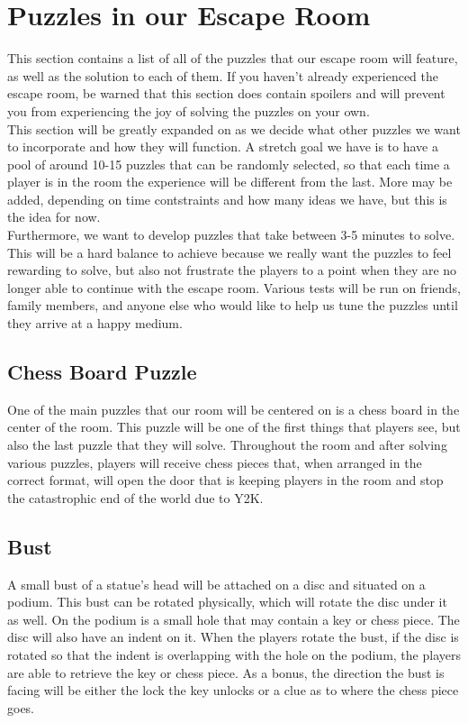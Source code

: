 \documentclass[conference]{IEEEtran}
\begin{document}
\section{Puzzles in our Escape Room}
This section contains a list of all of the puzzles that our escape room will feature, as well as
the solution to each of them. If you haven't already experienced the escape room, be warned that
this section does contain spoilers and will prevent you from experiencing the joy of solving the
puzzles on your own.
\\
\indent This section will be greatly expanded on as we decide what other puzzles we want to incorporate and how they will function.
A stretch goal we have is to have a pool of around 10-15 puzzles that can be randomly selected, so that each time a player is in the
room the experience will be different from the last. More may be added, depending on time contstraints and how many ideas we
have, but this is the idea for now.
\\
\indent Furthermore, we want to develop puzzles that take between 3-5 minutes to solve. This will be a hard balance
to achieve because we really want the puzzles to feel rewarding to solve, but also not frustrate the players
to a point when they are no longer able to continue with the escape room. Various tests will be run on friends, family members,
and anyone else who would like to help us tune the puzzles until they arrive at a happy medium.


\subsection{Chess Board Puzzle}
One of the main puzzles that our room will be centered on is a chess board in the center of the room.
This puzzle will be one of the first things that players see, but also the last puzzle that they will solve.
Throughout the room and after solving various puzzles, players will receive chess pieces that, when
arranged in the correct format, will open the door that is keeping players in the room and stop the
catastrophic end of the world due to Y2K.

\subsection{Bust}
A small bust of a statue's head will be attached on a disc and situated
on a podium. This bust can be rotated physically, which will rotate the
disc under it as well. On the podium is a small hole that may contain a key
or chess piece. The disc will also have an indent on it. When the players
rotate the bust, if the disc is rotated so that the indent is overlapping
with the hole on the podium, the players are able to retrieve the key
or chess piece. As a bonus, the direction the bust is facing will be either
the lock the key unlocks or a clue as to where the chess piece goes.
\end{document}
